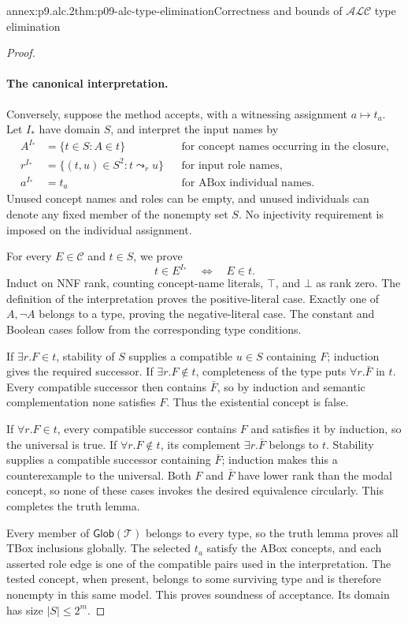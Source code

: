 \begin{annexitem}{annex:p9.alc.2}{thm:p09-alc-type-elimination}{Correctness and bounds of \(\mathcal{ALC}\) type elimination}
\begin{proof}
\paragraph{The canonical interpretation.}
Conversely, suppose the method accepts, with a witnessing assignment
\(a\mapsto t_a\).
Let \(I_*\) have domain \(S\), and interpret the input names by
\[
\begin{aligned}
 A^{I_*}&=\{t\in S:A\in t\}
              &&\text{for concept names occurring in the closure},\\
 r^{I_*}&=\{(t,u)\in S^2:t\leadsto_r u\}
              &&\text{for input role names},\\
 a^{I_*}&=t_a
              &&\text{for ABox individual names}.
\end{aligned}
\]
Unused concept names and roles can be empty, and unused individuals
can denote any fixed member of the nonempty set \(S\).
No injectivity requirement is imposed on the individual assignment.

For every \(E\in\mathcal C\) and \(t\in S\), we prove
\[
 t\in E^{I_*}\quad\Longleftrightarrow\quad E\in t.
\]
Induct on NNF rank, counting concept-name literals, \(\top\), and
\(\bot\) as rank zero.
The definition of the interpretation proves the positive-literal
case.  Exactly one of \(A,\neg A\) belongs to a type, proving the
negative-literal case.  The constant and Boolean cases follow from
the corresponding type conditions.

If \(\exists r.F\in t\), stability of \(S\) supplies a compatible
\(u\in S\) containing \(F\); induction gives the required successor.
If \(\exists r.F\notin t\), completeness of the type puts
\(\forall r.\bar F\) in \(t\).
Every compatible successor then contains \(\bar F\), so by induction
and semantic complementation none satisfies \(F\).
Thus the existential concept is false.

If \(\forall r.F\in t\), every compatible successor contains \(F\)
and satisfies it by induction, so the universal is true.
If \(\forall r.F\notin t\), its complement
\(\exists r.\bar F\) belongs to \(t\).
Stability supplies a compatible successor containing \(\bar F\);
induction makes this a counterexample to the universal.
Both \(F\) and \(\bar F\) have lower rank than the modal concept,
so none of these cases invokes the desired equivalence circularly.
This completes the truth lemma.

Every member of \(\mathsf{Glob}(\mathcal T)\) belongs to every type,
so the truth lemma proves all TBox inclusions globally.
The selected \(t_a\) satisfy the ABox concepts, and each asserted
role edge is one of the compatible pairs used in the interpretation.
The tested concept, when present, belongs to some surviving type
and is therefore nonempty in this same model.
This proves soundness of acceptance.
Its domain has size \(|S|\leq2^m\).


\end{proof}
\end{annexitem}
